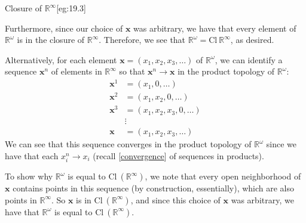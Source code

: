 \begin{egBox}{Closure of \( \mathbb{R}^{ \infty } \)}[eg:19.3]
    \baseSkip

    Furthermore, since our choice of \( \mathbf{x} \) was arbitrary, we have 
    that every element of \( \mathbb{R}^{ \omega } \) is in the closure of 
    \( \mathbb{R}^{ \infty } \).
    Therefore, we see that \( \mathbb{R}^{ \omega } = 
    \mathrm{Cl} \ \mathbb{R}^{ \infty } \), as desired.

    \baseRule

    Alternatively, for each element \( \mathbf{x} = ( x_{ 1 }, x_{ 2 }, 
    x_{ 3 }, \ldots ) \) of \( \mathbb{R}^{ \omega } \), we can identify a 
    sequence 
    \( \mathbf{x}^{ n } \) of elements in \( \mathbb{R}^{ \infty } \) so that 
    \( \mathbf{x}^{ n } \rightarrow \mathbf{x} \) in the product topology of 
    \( \mathbb{R}^{ \omega } \):
    \begin{equation*}
        \begin{aligned}
            \mathbf{x}^{ 1 } &= ( x_{ 1 }, 0, \ldots )
            \\
            \mathbf{x}^{ 2 } &= ( x_{ 1 }, x_{ 2 }, 0, \ldots )
            \\
            \mathbf{x}^{ 3 } &= ( x_{ 1 }, x_{ 2 }, x_{ 3 }, 0, \ldots )
            \\
            &\vdots 
            \\
            \mathbf{x} &= ( x_{ 1 }, x_{ 2 }, x_{ 3 }, \ldots )
        \end{aligned}
    \end{equation*}
    We can see that this sequence converges in the product topology of 
    \( \mathbb{R}^{ \omega } \) since we have that each \( x_{ i }^{ n } 
    \rightarrow x_{ i } \) (recall 
    [\hyperlink{thm:15_convergence_product}{convergence}] of sequences in 
    products).

    \baseSkip

    To show why \( \mathbb{R}^{ \omega } \) is equal to 
    \( \mathrm{Cl} \ ( \mathbb{R}^{ \infty } ) \), we note that 
    every open neighborhood of \( \mathbf{x} \) contains points in this 
    sequence (by construction, essentially), which are also points in 
    \( \mathbb{R}^{ \infty } \).
    So \( \mathbf{x} \) is in \( \mathrm{Cl} \ ( \mathbb{R}^{ \infty } ) \),
    and since this choice of \( \mathbf{x} \) was arbitrary, we have that 
    \( \mathbb{R}^{ \omega } \) is equal to 
    \( \mathrm{Cl} \ ( \mathbb{R}^{ \infty } ) \).
\end{egBox}